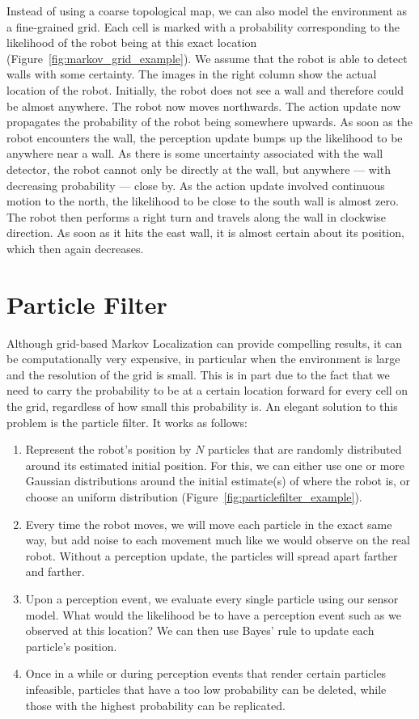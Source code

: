 Instead of using a coarse topological map, we can also model the environment as a fine-grained grid. Each cell is marked with a probability corresponding to the likelihood of the robot being at this exact location (Figure~\ref{fig:markov_grid_example}). We assume that the robot is able to detect walls with some certainty. The images in the right column show the actual location of the robot. Initially, the robot does not see a wall and therefore could be almost anywhere. The robot now moves northwards. The action update now propagates the probability of the robot being somewhere upwards. As soon as the robot encounters the wall, the perception update bumps up the likelihood to be anywhere near a wall. As there is some uncertainty associated with the wall detector, the robot cannot only be directly at the wall, but anywhere --- with decreasing probability --- close by. As the action update involved continuous motion to the north, the likelihood to be close to the south wall is almost zero. The robot then performs a right turn and travels along the wall in clockwise direction. As soon as it hits the east wall, it is almost certain about its position, which then again decreases.

\section{Particle Filter}
Although grid-based Markov Localization can provide compelling results, it can be computationally very expensive, in particular when the environment is large and the resolution of the grid is small. This is in part due to the fact that we need to carry the probability to be at a certain location forward for every cell on the grid, regardless of how small this probability is. An elegant solution to this problem is the particle filter. It works as follows:
\begin{enumerate}
\item Represent the robot's position by $N$ particles that are randomly distributed around its estimated initial position. For this, we can either use one or more Gaussian distributions around the initial estimate(s) of where the robot is, or choose an uniform distribution (Figure~\ref{fig:particlefilter_example}).
\item Every time the robot moves, we will move each particle in the exact same way, but add noise to each movement much like we would observe on the real robot. Without a perception update, the particles will spread apart farther and farther.
\item Upon a perception event, we evaluate every single particle using our sensor model. What would the likelihood be to have a perception event such as we observed at this location? We can then use Bayes' rule to update each particle's position.
\item Once in a while or during perception events that render certain particles infeasible, particles that have a too low probability can be deleted, while those with the highest probability can be replicated.
\end{enumerate}

